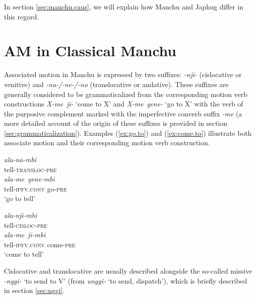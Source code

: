 \documentclass{article}
\newcommand{\ipa}[1]{\textit{{\phon\mbox{#1}}}} %
\begin{document}
  In section \ref{sec:manchu.caus}, we will explain how Manchu and Japhug differ in this regard.
  
\section{AM in Classical Manchu} \label{sec:manchu}

Associated motion in Manchu is expressed by two suffixes: \ipa{-nji-} (cislocative or venitive) and \ipa{-na-/-ne-/-no} (translocative or andative). These suffixes are generally considered to be grammaticalized from the corresponding motion verb constructions \ipa{X-me ji-} `come to X' and \ipa{X-me gene-}  `go to X' with the verb of the purposive complement marked with the imperfective converb suffix \ipa{-me} (a more detailed account of the origin of these suffixes is provided in section \ref{sec:grammaticalization}). Examples (\ref{ex:go.to}) and (\ref{ex:come.to}) illustrate both associate motion and their corresponding motion verb construction.

\begin{exe}
\ex \label{ex:go.to}
\begin{xlist}
 \label{ex:alanambi}
\gll \ipa{ala-na-mbi} \\
tell-\textsc{transloc-pre} \\
 \label{ex:alame.genembi}
\gll \ipa{ala-me gene-mbi} \\
tell-\textsc{ipfv.conv} go-\textsc{pre} \\
\glt `go to tell'
\end{xlist}
\ex \label{ex:come.to}
\begin{xlist}
 \label{ex:alanjimbi}
\gll \ipa{ala-nji-mbi} \\
tell-\textsc{cisloc-pre} \\
  \label{ex:alame.jimbi}
\gll \ipa{ala-me ji-mbi} \\
tell-\textsc{ipfv.conv} come-\textsc{pre} \\
\glt `come to tell'
\end{xlist}
\end{exe}

Cislocative and translocative are usually described alongside the so-called missive \ipa{-nggi-} ‘to send to V’ (from \ipa{unggi-} ‘to send, dispatch’), which is briefly described in section \ref{sec:nggi}.
\end{document}
